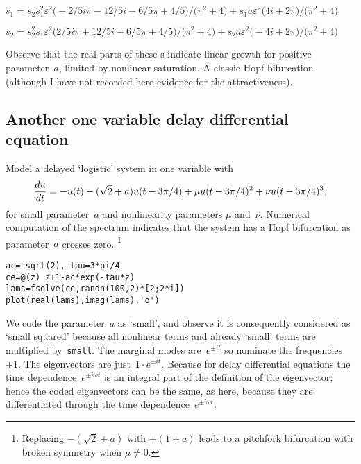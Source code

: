 \documentclass[11pt,a5paper]{article}
\begin{document}
\begin{math}
\dot s_{1}=s_{2} s_{1}^{2} \varepsilon ^{2} \big(-2/5 i \pi -12/5 i-6/5 
\pi +4/5\big)/\big(\pi ^{2}+4\big)+s_{1} a \varepsilon ^{2} \big(4 i+2 
\pi \big)/\big(\pi ^{2}+4\big)
\end{math}\par

\begin{math}
\dot s_{2}=s_{2}^{2} s_{1} \varepsilon ^{2} \big(2/5 i \pi +12/5 i-6/5 
\pi +4/5\big)/\big(\pi ^{2}+4\big)+s_{2} a \varepsilon ^{2} \big(-4 i+2 
\pi \big)/\big(\pi ^{2}+4\big)
\end{math}\par

Observe that the real parts of these \ode{}s indicate linear growth for positive parameter~\(a\), limited by nonlinear saturation.
A classic Hopf bifurcation (although I have not recorded here evidence for the attractiveness).


\subsection{Another one variable delay differential equation}

Model a delayed `logistic' system in one variable with
\begin{equation*}
\de tu=-u(t)-(\sqrt2+a)u(t-3\pi/4)+\mu u(t-3\pi/4)^2+\nu u(t-3\pi/4)^3,
\end{equation*}
for small parameter~\(a\) and nonlinearity parameters \(\mu\) and~\(\nu\).  Numerical computation of the spectrum indicates that the system has a Hopf bifurcation as parameter~\(a\) crosses zero.%
\footnote{Replacing \(-(\sqrt2+a)\) with \(+(1+a)\) leads to a pitchfork bifurcation with broken symmetry when \(\mu\neq 0\).}
\begin{verbatim}
ac=-sqrt(2), tau=3*pi/4
ce=@(z) z+1-ac*exp(-tau*z)
lams=fsolve(ce,randn(100,2)*[2;2*i])
plot(real(lams),imag(lams),'o')
\end{verbatim}
We code the parameter~\(a\) as `small', and observe it is consequently considered as `small squared' because all nonlinear terms and already `small' terms are multiplied by~\verb|small|.
The marginal modes are~\(e^{\pm it}\) so nominate the frequencies~\(\pm 1\).
The eigenvectors are just~\(1\cdot e^{\pm it}\). 
Because for delay differential equations the time dependence~\(e^{\pm i\omega t}\) is an integral part of the definition of the eigenvector; hence the coded eigenvectors can be the same, as here, because they are differentiated through the time dependence~\(e^{\pm i\omega t}\).
\end{document}
